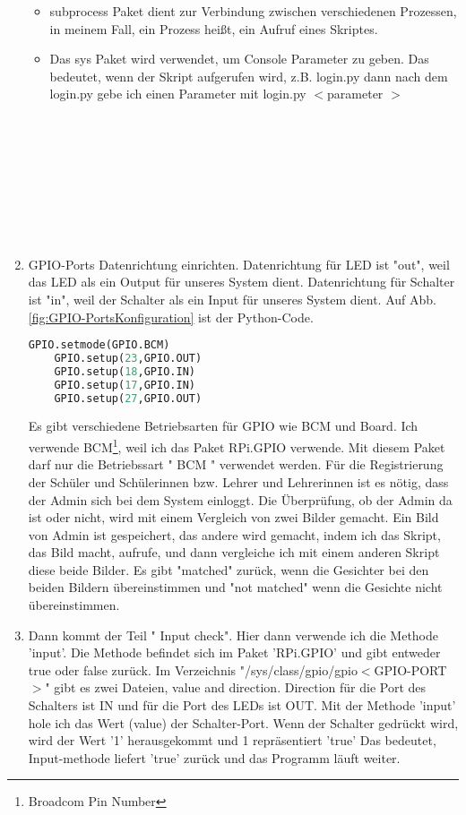 \begin{enumerate}
\begin{itemize}
	 \item subprocess Paket dient zur Verbindung zwischen verschiedenen Prozessen, in meinem Fall, ein Prozess hei{\ss}t, ein Aufruf eines Skriptes.
	 
	 \item Das sys Paket wird verwendet, um Console Parameter zu geben. Das bedeutet, wenn der Skript aufgerufen wird, z.B. login.py dann nach dem login.py gebe ich einen Parameter mit login.py $<$parameter $>$ \\ \\ \\ \\ \\ \\ \\ \\ \\ 
   \end{itemize}
	\item GPIO-Ports Datenrichtung einrichten. Datenrichtung f\"ur LED ist "out", weil das LED als ein Output f\"ur unseres System dient. Datenrichtung f\"ur Schalter ist "in", weil der Schalter als ein Input f\"ur unseres System dient. Auf Abb. \ref{fig:GPIO-PortsKonfiguration} ist der Python-Code.
	\begin{lstlisting}[caption={GPIO-Ports Konfiguration},label={fig:GPIO-PortsKonfiguration},language=Python]
	GPIO.setmode(GPIO.BCM)
	GPIO.setup(23,GPIO.OUT)
	GPIO.setup(18,GPIO.IN)
	GPIO.setup(17,GPIO.IN)
	GPIO.setup(27,GPIO.OUT)
	\end{lstlisting}
	Es gibt verschiedene Betriebsarten f\"ur GPIO wie BCM und Board.
	Ich verwende BCM\footnote{Broadcom Pin Number}, weil ich das Paket RPi.GPIO verwende. Mit diesem Paket darf nur die Betriebssart " BCM " verwendet werden. 
	\cite{gpiomode}
	F\"ur die Registrierung der Sch\"uler und Sch\"ulerinnen bzw. Lehrer und Lehrerinnen ist es n\"otig, dass der Admin sich bei dem System einloggt. Die \"Uberpr\"ufung, ob der Admin da ist oder nicht,  wird mit einem Vergleich von zwei Bilder gemacht. Ein Bild von Admin ist gespeichert, das andere wird gemacht, indem ich das Skript, das Bild macht, aufrufe, und dann vergleiche ich mit einem anderen Skript diese beide Bilder. Es gibt "matched" zur\"uck, wenn die Gesichter bei den beiden Bildern \"ubereinstimmen und "not matched" wenn die Gesichte nicht \"ubereinstimmen.
	\item Dann kommt der Teil " Input check". 
	Hier dann verwende ich die Methode 'input'. Die Methode befindet sich im Paket 'RPi.GPIO' und gibt entweder true oder false zur\"uck. 
	Im Verzeichnis "/sys/class/gpio/gpio$<$GPIO-PORT$>$" gibt es zwei Dateien, value and direction. Direction f\"ur die Port des Schalters ist IN und f\"ur die Port des LEDs ist OUT. Mit der Methode 'input' hole ich das Wert (value) der Schalter-Port. Wenn der Schalter gedr\"uckt wird, wird der Wert '1' herausgekommt und 1 repr\"asentiert 'true' Das bedeutet, Input-methode liefert 'true' zur\"uck und das Programm l\"auft weiter.
	

\end{enumerate}
